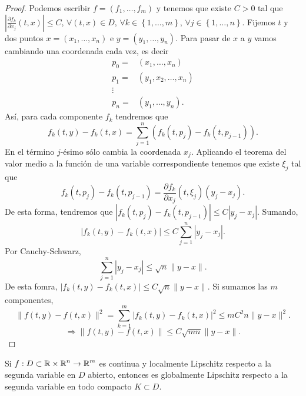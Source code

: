 \begin{proof}
	Podemos escribir $\displaystyle f = \left(f_{1}, \ldots, f_{m}\right) $ y tenemos que existe $\displaystyle C > 0 $ tal que $\displaystyle \left|\frac{\partial f_{k}}{\partial x_{j}}\left(t, x\right)\right|\leq C $, $\displaystyle \forall\left(t,x\right)\in D $, $\displaystyle \forall k \in \left\{ 1, \ldots, m\right\}  $, $\displaystyle \forall j \in \left\{ 1, \ldots, n\right\}  $. Fijemos $\displaystyle t $ y dos puntos $\displaystyle x = \left(x_{1}, \ldots, x_{n}\right) $ e $\displaystyle y = \left(y_{1}, \ldots, y_{n}\right) $. 
	Para pasar de $\displaystyle x $ a $\displaystyle y $ vamos cambiando una coordenada cada vez, es decir
	\[
	\begin{split}
		p_{0}=& \left(x_{1}, \ldots, x_{n}\right) \\
		p_{1} = & \left(y_{1}, x_{2}, \ldots, x_{n}\right)\\
		\vdots & \\
		p_{n} =& \left(y_{1}, \ldots, y_{n}\right).
	\end{split}
	\]
	Así, para cada componente $\displaystyle f_{k} $ tendremos que
	\[f_{k}\left(t,y\right)-f_{k}\left(t,x\right)=\sum^{n}_{j= 1}\left(f_{k}\left(t, p_{j}\right)-f_{k}\left(t,p_{j-1}\right)\right) .\]
	En el término $\displaystyle j $-ésimo sólo cambia la coordenada $\displaystyle x_{j} $. Aplicando el teorema del valor medio a la función de una variable correspondiente tenemos que existe $\displaystyle \xi_{j} $ tal que 
	\[f_{k}\left(t, p_{j}\right)-f_{k}\left(t, p_{j-1}\right)=\frac{\partial f_{k}}{\partial x_{j}}\left(t, \xi_{j}\right)\left(y_{j}-x_{j}\right) .\]
	De esta forma, tendremos que $\displaystyle \left|f_{k}\left(t, p_{j}\right)-f_{k}\left(t, p_{j-1}\right)\right|\leq C \left|y_{j}-x_{j}\right| $. Sumando,
	\[ \left|f_{k}\left(t,y\right)-f_{k}\left(t,x\right)\right|\leq C\sum^{n}_{j=1} \left|y_{j}-x_{j}\right| .\]
	Por Cauchy-Schwarz,
	\[\sum^{n}_{j=1} \left|y_{j}-x_{j}\right| \leq \sqrt{n} \|y-x\|.\]
	De esta fomra, $\displaystyle \left|f_{k}\left(t,y\right)-f_{k}\left(t,x\right)\right|\leq C\sqrt{n}\|y-x\| $. Si sumamos las $\displaystyle m $ componentes,
	\[\|f\left(t,y\right)-f\left(t,x\right)\|^{2} = \sum^{m}_{k=1} \left|f_{k}\left(t,y\right)-f_{k}\left(t,x\right)\right|^{2}\leq mC^{2}n\|y-x\|^{2} .\]
\[\Rightarrow \|f\left(t,y\right)-f\left(t,x\right)\|\leq C\sqrt{mn}\|y-x\| .\]	
\end{proof}
\begin{prop}
Si $\displaystyle f : D \subset \mathbb{R} \times \mathbb{R}^{n} \to \mathbb{R}^{m} $ es continua y localmente Lipschitz respecto a la segunda variable en $\displaystyle D $ abierto, entonces es globalmente Lipschitz respecto a la segunda variable en todo compacto $\displaystyle K \subset D $.
\end{prop}
